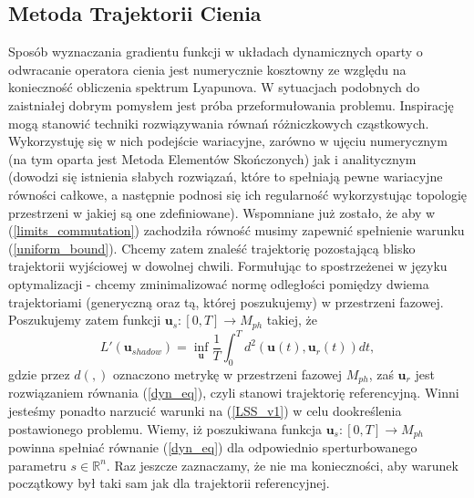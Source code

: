 \documentclass[12pt]{article}
\begin{document}
\subsection{Metoda Trajektorii Cienia} 
Sposób wyznaczania gradientu funkcji w układach dynamicznych oparty o odwracanie operatora cienia jest numerycznie kosztowny ze względu na konieczność obliczenia spektrum Lyapunova. \newline
W sytuacjach podobnych do zaistniałej dobrym pomysłem jest próba przeformułowania problemu. Inspirację mogą stanowić techniki rozwiązywania równań różniczkowych cząstkowych. Wykorzystuję się w nich podejście wariacyjne, zarówno w ujęciu numerycznym (na tym oparta jest Metoda Elementów Skończonych) jak i analitycznym (dowodzi się istnienia słabych rozwiązań, które to spełniają pewne wariacyjne równości całkowe, a następnie podnosi się ich regularność wykorzystując topologię przestrzeni w jakiej są one zdefiniowane). Wspomniane już zostało, że aby w (\ref{limits_commutation}) zachodziła równość musimy zapewnić spełnienie warunku (\ref{uniform_bound}). Chcemy zatem znaleść trajektorię pozostającą blisko trajektorii wyjściowej w dowolnej chwili. Formułując to spostrzeżenei w języku optymalizacji - chcemy zminimalizować normę odległości pomiędzy dwiema trajektoriami (generyczną oraz tą, której poszukujemy) w przestrzeni fazowej. Poszukujemy zatem funkcji $ \textbf{u}_s: [0,T] \rightarrow M_{ph} $ takiej, że
\begin{equation}
L'(\textbf{u}_{shadow}) = \inf_{\textbf{u}}\frac{1}{T}\int_{0}^{T}d^{2}(\textbf{u}(t),\textbf{u}_r(t))dt,
\label{LSS_v1}
\end{equation}
gdzie przez $ d(,) $ oznaczono metrykę w przestrzeni fazowej $ M_{ph} $, zaś $ \textbf{u}_r $ jest rozwiązaniem równania (\ref{dyn_eq}), czyli stanowi trajektorię referencyjną. Winni jesteśmy ponadto narzucić warunki na (\ref{LSS_v1}) w celu dookreślenia postawionego problemu. Wiemy, iż poszukiwana funkcja $ \textbf{u}_s: [0,T] \rightarrow M_{ph} $ powinna spełniać równanie (\ref{dyn_eq}) dla odpowiednio sperturbowanego parametru $ s \in \mathbb{R}^{n} $. Raz jeszcze zaznaczamy, że nie ma konieczności, aby warunek początkowy był taki sam jak dla trajektorii referencyjnej.\newline
\end{document}
